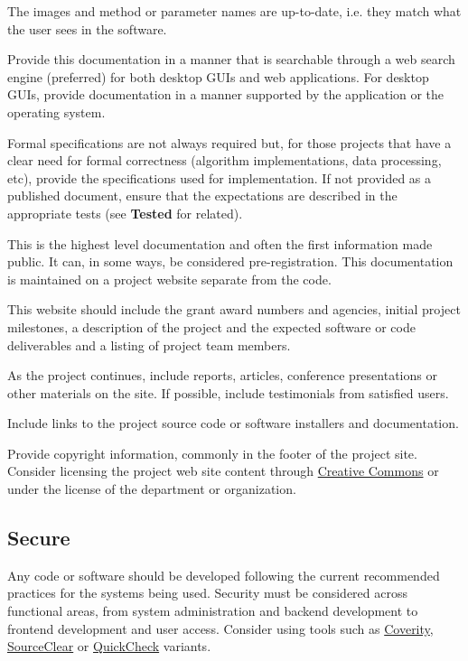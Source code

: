 \documentclass{article}
\newcounter{subsubsubsection}[subsubsection]
\begin{document}
The images and method or parameter names are up-to-date, i.e. they match what the user sees in the software. 
 
Provide this documentation in a manner that is searchable through a web search engine (preferred) for both desktop GUIs and web applications. For desktop GUIs, provide documentation in a manner supported by the application or the operating system. 

Formal specifications are not always required but, for those projects that have a clear need for formal correctness (algorithm implementations, data processing, etc), provide the specifications used for implementation. If not provided as a published document, ensure that the expectations are described in the appropriate tests (see \textbf{Tested} for related). 

This is the highest level documentation and often the first information made public. It can, in some ways, be considered pre-registration. This documentation is maintained on a project website separate from the code.
 
This website should include the grant award numbers and agencies, initial project milestones, a description of the project and the expected software or code deliverables and a listing of project team members.
 
As the project continues, include reports, articles, conference presentations or other materials on the site. If possible, include testimonials from satisfied users.
 
Include links to the project source code or software installers and documentation.
 
Provide copyright information, commonly in the footer of the project site. Consider licensing the project web site content through \href{https://creativecommons.org/} {Creative Commons} or under the license of the department or organization. 

\subsection{Secure}
Any code or software should be developed following the current recommended practices for the systems being used. Security must be considered across functional areas, from system administration and backend development to frontend development and user access. Consider using tools such as \href{https://www.synopsys.com/software-integrity/products/static-code-analysis.html#} {Coverity}, \href{https://www.sourceclear.com/} {SourceClear} or \href{https://hackage.haskell.org/package/QuickCheck} {QuickCheck} variants.
 
\end{document}
